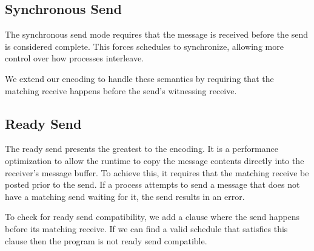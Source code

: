 \subsection{Synchronous Send}
The synchronous send mode requires that the message is received before the send
is considered complete. This forces schedules to synchronize, allowing more
control over how processes interleave.

We extend our encoding to handle these semantics by requiring that the matching
receive happens before the send's witnessing receive.

\subsection{Ready Send}
The ready send presents the greatest to the encoding. It is a performance
optimization to allow the runtime to copy the message contents directly into the
receiver's message buffer. To achieve this, it requires that the matching receive
be posted prior to the send. If a process attempts to send a message that does
not have a matching send waiting for it, the send results in an error.

To check for ready send compatibility, we add a clause where the send happens
before its matching receive. If we can find a valid schedule that satisfies this
clause then the program is not ready send compatible.

